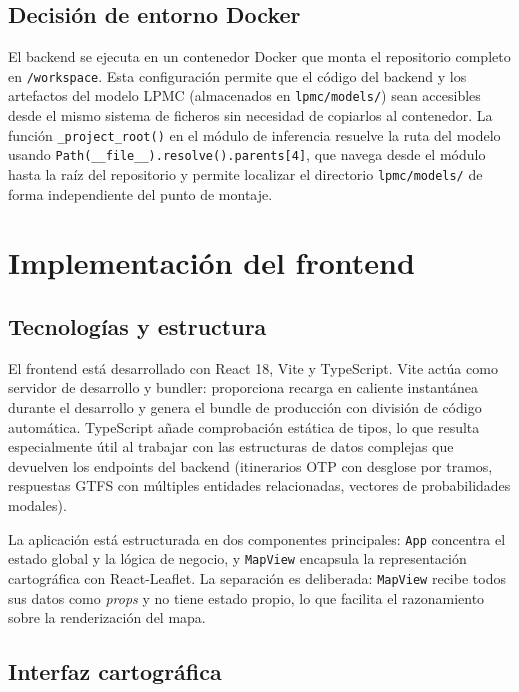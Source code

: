 \subsection{Decisión de entorno Docker}

El backend se ejecuta en un contenedor Docker que monta el repositorio completo en \texttt{/workspace}. Esta configuración permite que el código del backend y los artefactos del modelo LPMC (almacenados en \texttt{lpmc/models/}) sean accesibles desde el mismo sistema de ficheros sin necesidad de copiarlos al contenedor. La función \texttt{\_project\_root()} en el módulo de inferencia resuelve la ruta del modelo usando \texttt{Path(\_\_file\_\_).resolve().parents[4]}, que navega desde el módulo hasta la raíz del repositorio y permite localizar el directorio \texttt{lpmc/models/} de forma independiente del punto de montaje.

\section{Implementación del frontend}
\label{sec:impl_frontend}

\subsection{Tecnologías y estructura}

El frontend está desarrollado con React 18, Vite y TypeScript. Vite actúa como servidor de desarrollo y bundler: proporciona recarga en caliente instantánea durante el desarrollo y genera el bundle de producción con división de código automática. TypeScript añade comprobación estática de tipos, lo que resulta especialmente útil al trabajar con las estructuras de datos complejas que devuelven los endpoints del backend (itinerarios OTP con desglose por tramos, respuestas GTFS con múltiples entidades relacionadas, vectores de probabilidades modales).

La aplicación está estructurada en dos componentes principales: \texttt{App} concentra el estado global y la lógica de negocio, y \texttt{MapView} encapsula la representación cartográfica con React-Leaflet. La separación es deliberada: \texttt{MapView} recibe todos sus datos como \textit{props} y no tiene estado propio, lo que facilita el razonamiento sobre la renderización del mapa.

\subsection{Interfaz cartográfica}

